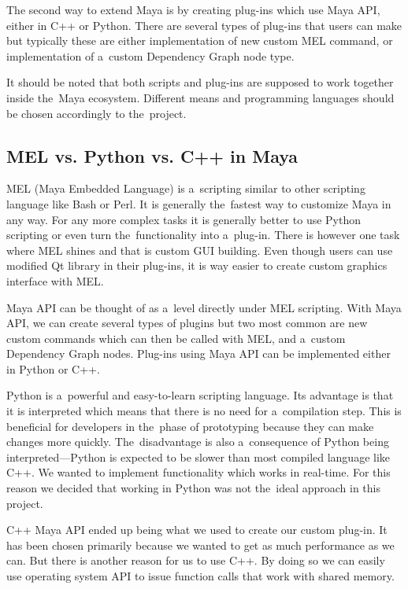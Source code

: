 \documentclass[
  digital, %
  table,   %
  nolof,     %
  nolot,     %
  oneside,
]{fithesis3}
\begin{document}
The second way to extend Maya is by creating plug-ins which use Maya API, either in C++ or Python. There are several types of plug-ins that users can make but typically these are either implementation of new custom MEL command, or implementation of a custom Dependency Graph node type.

It should be noted that both scripts and plug-ins are supposed to work together inside the Maya ecosystem. Different means and programming languages should be chosen accordingly to the project.

\subsection{MEL vs. Python vs. C++ in Maya}
MEL (Maya Embedded Language) is a scripting similar to other scripting language like Bash or Perl. It is generally the fastest way to customize Maya in any way. For any more complex tasks it is generally better to use Python scripting or even turn the functionality into a plug-in. There is however one task where MEL shines and that is custom GUI building. Even though users can use modified Qt library in their plug-ins, it is way easier to create custom graphics interface with MEL.

Maya API can be thought of as a level directly under MEL scripting. With Maya API, we can create several types of plugins but two most common are new custom commands which can then be called with MEL, and a custom Dependency Graph nodes. Plug-ins using Maya API can be implemented either in Python or C++.

Python is a powerful and easy-to-learn scripting language. Its advantage is that it is interpreted which means that there is no need for a compilation step. This is beneficial for developers in the phase of prototyping because they can make changes more quickly. The disadvantage is also a consequence of Python being interpreted—Python is expected to be slower than most compiled language like C++. We wanted to implement functionality which works in real-time. For this reason we decided that working in Python was not the ideal approach in this project.

C++ Maya API ended up being what we used to create our custom plug-in. It has been chosen primarily because we wanted to get as much performance as we can. But there is another reason for us to use C++. By doing so we can easily use operating system API to issue function calls that work with shared memory.
\end{document}
